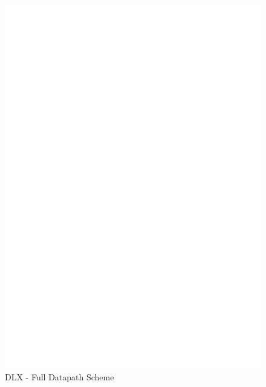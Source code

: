 \documentclass[12pt]{article}
\begin{document}
\begin{landscape}
	\begin{figure}[!ht]
		\includegraphics[height=1\textheight,center]{images/SCHEME_DLX_FW.eps}
		\caption{DLX - Full Datapath Scheme}
		\label{FULLDLX}
	\end{figure}
	\end{landscape}
\end{document}
